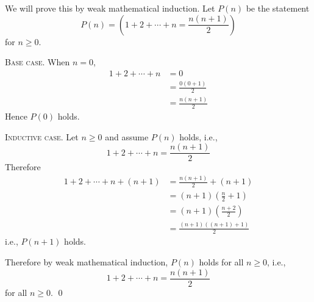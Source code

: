 We will prove this by weak mathematical induction.
Let $P(n)$ be the statement
\[
P(n) =
\left(
1 + 2 + \cdots + n = \frac{n(n + 1)}{2}
\right)
\]
for $n \geq 0$.

\textsc{Base case}.
When $n = 0$,
\begin{align*}
1 + 2 + \cdots + n
&= 0 \\
&= \frac{0(0 + 1)}{2} \\
&= \frac{n(n + 1)}{2} 
\end{align*}
Hence $P(0)$ holds.

\textsc{Inductive case}.
Let $n \geq 0$ and assume $P(n)$ holds, i.e.,
\[
1 + 2 + \cdots + n = \frac{n(n + 1)}{2}
\]
Therefore
\begin{align*}
1 + 2 + \cdots + n + (n + 1)
&= \frac{n(n + 1)}{2} + (n + 1) \\
&= (n + 1) \left( \frac{n}{2} + 1 \right) \\
&= (n + 1) \left( \frac{n + 2}{2} \right) \\
&= \frac{(n + 1)((n + 1) + 1)}{2} 
\end{align*}
i.e., $P(n + 1)$ holds.

Therefore by weak mathematical induction, $P(n)$ holds for all
$n \geq 0$, i.e.,
\[
1 + 2 + \cdots + n 
= \frac{n(n + 1)}{2} 
\]
for all $n \geq 0$.
\qed

